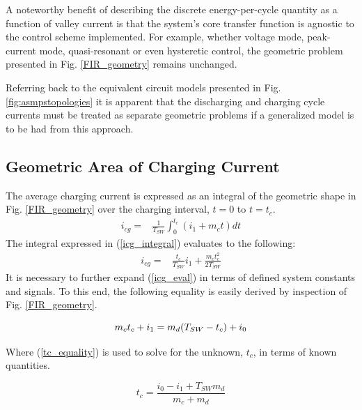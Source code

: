 \documentclass[conference]{IEEEtran}
\begin{document}
A noteworthy benefit of describing the discrete energy-per-cycle quantity as a function of valley current is that the system's core transfer function is agnostic to the control scheme implemented.  For example, whether voltage mode, peak-current mode, quasi-resonant or even hysteretic control, the geometric problem presented in Fig. \ref{FIR_geometry} remains unchanged.

Referring back to the equivalent circuit models presented in Fig. \ref{fig:asmpstopologies} it is apparent that the discharging and charging cycle currents must be treated as separate geometric problems if a generalized model is to be had from this approach.

\subsection{Geometric Area of Charging Current}
The average charging current is expressed as an integral of the geometric shape in Fig. \ref{FIR_geometry} over the charging interval, $t=0$ to $t=t_c$.
\begin{align}
i_{cg} = & \frac{1}{T_{SW}}\int_0^{t_c}(i_1 + m_c t)dt \label{icg_integral}
\end{align}
The integral expressed in (\ref{icg_integral}) evaluates to the following:
\begin{align}
i_{cg} = & \frac{t_c}{T_{SW}} i_1 + \frac{m_ct_c^2}{2T_{SW}} \label{icg_eval}
\end{align}
It is necessary to further expand (\ref{icg_eval}) in terms of defined system constants and signals.  To this end, the following equality is easily derived by inspection of Fig. \ref{FIR_geometry}.

\begin{equation}
m_ct_c+i_1 = m_d(T_{SW} - t_c)+i_0\\ \label{tc_equality}
\end{equation}

Where (\ref{tc_equality}) is used to solve for the unknown, $t_c$, in terms of known quantities.

\begin{equation}
t_c = \frac{i_0-i_1+T_{SW}m_d}{m_c+m_d} \label{tcharge}
\end{equation}	
\end{document}
